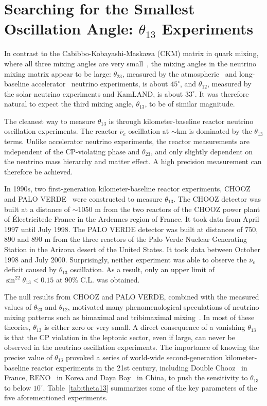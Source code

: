 \section{Searching for the Smallest Oscillation Angle: $\theta_{13}$ Experiments} 
\label{sec:theta13}
In contrast to the  Cabibbo-Kobayashi-Maskawa (CKM) matrix in quark mixing, where all three mixing angles are very small~\cite{PDG14}, the mixing angles in the neutrino mixing matrix appear to be large: $\theta_{23}$, measured by the atmospheric~\cite{Kajita} and long-baseline accelerator~\cite{Feldman} neutrino experiments, is about $45^\circ$, and $\theta_{12}$, measured by the solar neutrino experiments and KamLAND, is about $33^\circ$. It was therefore natural to expect the third mixing angle, $\theta_{13}$, to be of similar magnitude.

The cleanest way to measure $\theta_{13}$ is through kilometer-baseline reactor neutrino oscillation experiments. The reactor $\bar\nu_e$ oscillation at $\sim$km is dominated by the $\theta_{13}$ terms. Unlike accelerator neutrino experiments, the reactor measurements are independent of the CP-violating phase and $\theta_{23}$, and only slightly dependent on the neutrino mass hierarchy and matter effect. A high precision measurement can therefore be achieved.

In 1990s, two first-generation kilometer-baseline reactor experiments, CHOOZ~\cite{Chooz} and PALO VERDE~\cite{Paloverde} were constructed to measure $\theta_{13}$. 
The CHOOZ detector was built at a distance of $\sim$1050 m from the two reactors of the CHOOZ power plant of \'{E}lectricite\'{d}e France in the Ardennes region of France. It took data from April 1997 until July 1998. 
The PALO VERDE detector was built at distances of 750, 890 and 890 m from the three reactors of the Palo Verde Nuclear Generating Station in the Arizona desert of the United States. It took data between October 1998 and July 2000. 
Surprisingly, neither experiment was able to observe the $\bar\nu_e$ deficit caused by $\theta_{13}$ oscillation. 
As a result, only an upper limit of $\sin^22\theta_{13} < 0.15$ at 90\% C.L. was obtained.

The null results from CHOOZ and PALO VERDE, combined with the measured values of $\theta_{23}$ and $\theta_{12}$, motivated many phenomenological speculations of neutrino mixing patterns such as bimaximal and tribimaximal mixing~\cite{Harrison,Altarelli}. 
In most of these theories, $\theta_{13}$ is either zero or very small. 
A direct consequence of a vanishing $\theta_{13}$ is that the CP violation in the leptonic sector, even if large, can never be observed in the neutrino oscillation experiments. 
The importance of knowing the precise value of $\theta_{13}$ provoked a series of world-wide second-generation kilometer-baseline reactor experiments in the 21st century, including Double Chooz~\cite{DChooz} in France, RENO~\cite{Reno} in Korea and Daya Bay~\cite{Dayabay} in China, to push the sensitivity to $\theta_{13}$ to below $10^\circ$. 
Table~\ref{tab:theta13} summarizes some of the key parameters of the five aforementioned experiments.

